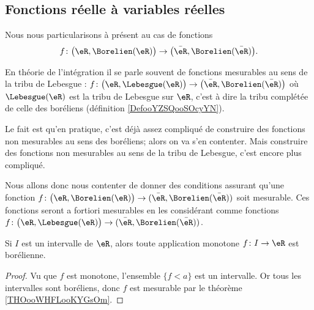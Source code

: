 \subsection{Fonctions réelle à variables réelles}

Nous nous particularisons à présent au cas de fonctions
\begin{equation}
    f\colon \big( \eR,\Borelien(\eR) \big)\to \big( \bar\eR,\Borelien(\bar \eR) \big).
\end{equation}

\begin{remark}
    En théorie de l'intégration il se parle souvent de fonctions mesurables au sens de la tribu de Lebesgue : $f\colon \big( \eR,\Lebesgue(\eR) \big)\to \big( \bar\eR,\Borelien(\bar \eR) \big)$ où \( \Lebesgue(\eR)\) est la tribu de Lebesgue sur \( \eR\), c'est à dire la tribu complétée de celle des boréliens (définition \ref{DefooYZSQooSOcyYN}).

    Le fait est qu'en pratique, c'est déjà assez compliqué de construire des fonctions non mesurables au sens des boréliens; alors on va s'en contenter. Mais construire des fonctions non mesurables au sens de la tribu de Lebesgue, c'est encore plus compliqué.

    Nous allons donc nous contenter de donner des conditions assurant qu'une fonction \( f\colon  \big( \eR,\Borelien(\eR) \big)   \to (\bar \eR,\Borelien(\bar \eR))  \) soit mesurable. Ces fonctions seront a fortiori mesurables en les considérant comme fonctions \( f\colon   \big( \eR,\Lebesgue(\eR) \big)  \to  (\bar\eR,\Borelien(\bar \eR)) \).
\end{remark}

\begin{corollary}       \label{CorooJYDVooCrXVun}
    Si \( I\) est un intervalle de \( \eR\), alors toute application monotone \( f\colon I\to \eR\) est borélienne.
\end{corollary}

\begin{proof}
    Vu que \( f\) est monotone, l'ensemble \( \{ f<a \}\) est un intervalle. Or tous les intervalles sont boréliens, donc \( f\) est mesurable par le théorème \ref{THOooWHFLooKYGsOm}.
\end{proof}

